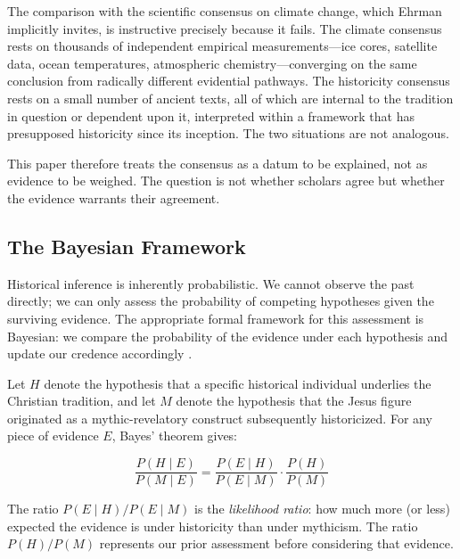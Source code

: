 \documentclass[12pt,oneside]{article}
\begin{document}
The comparison with the scientific consensus on climate change, which
Ehrman implicitly invites, is instructive precisely because it fails.
The climate consensus rests on thousands of independent empirical
measurements---ice cores, satellite data, ocean temperatures, atmospheric
chemistry---converging on the same conclusion from radically different
evidential pathways.  The historicity consensus rests on a small number
of ancient texts, all of which are internal to the tradition in question
or dependent upon it, interpreted within a framework that has
presupposed historicity since its inception.  The two situations are not
analogous.

This paper therefore treats the consensus as a datum to be explained,
not as evidence to be weighed.  The question is not whether scholars
agree but whether the evidence warrants their agreement.

\subsection{The Bayesian Framework}
\label{sec:method:bayes}

Historical inference is inherently probabilistic.  We cannot observe the
past directly; we can only assess the probability of competing
hypotheses given the surviving evidence.  The appropriate formal
framework for this assessment is Bayesian: we compare the probability of
the evidence under each hypothesis and update our credence accordingly
\citep{Carrier2012}.

Let $H$ denote the hypothesis that a specific historical individual
underlies the Christian tradition, and let $M$ denote the hypothesis
that the Jesus figure originated as a mythic-revelatory construct
subsequently historicized.  For any piece of evidence $E$, Bayes'
theorem gives:

\begin{equation}
\label{eq:bayes}
\frac{P(H \mid E)}{P(M \mid E)}
  = \frac{P(E \mid H)}{P(E \mid M)} \cdot \frac{P(H)}{P(M)}
\end{equation}

\noindent
The ratio $P(E \mid H) / P(E \mid M)$ is the \textit{likelihood ratio}:
how much more (or less) expected the evidence is under historicity than
under mythicism.  The ratio $P(H)/P(M)$ represents our prior
assessment before considering that evidence.
\end{document}
